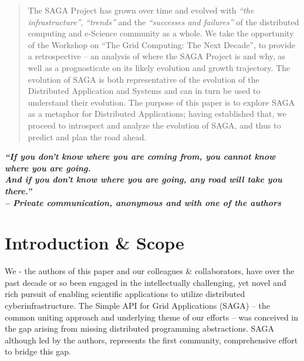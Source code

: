 \documentclass{article}
\newcommand{\I}[1]{\textit{#1}}
\begin{document}
\begin{abstract}

  The SAGA Project has grown over time and evolved with \I{``the
    infrastructure''}, \I{``trends''} and the \I{``successes and
    failures''} of the distributed computing and e-Science community
  as a whole.  We take the opportunity of the Workshop on ``The Grid
  Computing: The Next Decade'', to provide a retrospective -- an
  analysis of where the SAGA Project is and why, as well as a
  prognosticate on its likely evolution and growth trajectory.  The
  evolution of SAGA is both representative of the evolution of the
  Distributed Application and Systems and can in turn be used to
  understand their evolution.  The purpose of this paper is to explore
  SAGA as a metaphor for Distributed Applications; having established
  that, we proceed to introspect and analyze the evolution of SAGA,
  and thus to predict and plan the road ahead.
\end{abstract}
\begin{center}

  \footnotesize{\bf{\it ``If you don't know where you are coming from,
      you cannot know where you are going. \\ And if you don't know
      where you are going, any road will take you there.''  \\
      -- Private communication, anonymous and with one of the
      authors}}

\end{center}

\section{Introduction \& Scope }
\label{sec:intro}


We - the authors of this paper and our colleagues \& collaborators,
have over the past decade or so been engaged in the intellectually
challenging, yet novel and rich pursuit of enabling scientific
applications to utilize distributed cyberinfrastructure.  The Simple
API for Grid Applications (SAGA) -- the common uniting approach and
underlying theme of our efforts -- was conceived in the gap arising
from missing distributed programming abstractions. SAGA although led
by the authors, represents the first community, comprehensive effort
to bridge this gap.
\end{document}
